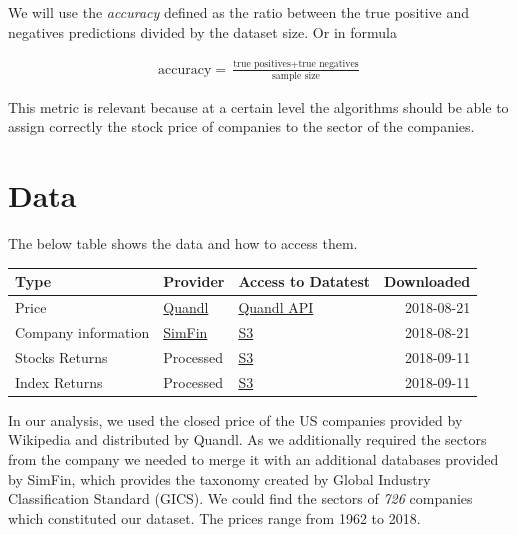\documentclass[a4paper,twoside]{article}
\begin{document}
We will use the \emph{accuracy} defined as the ratio between the true positive and
negatives predictions divided by the dataset size. Or in formula

\begin{align*}
  \textrm{accuracy} = \frac{\textrm{true positives} + \textrm{true negatives}}{\textrm{sample size}}
\end{align*}

This metric is relevant because at a certain level the algorithms should be
able to assign correctly the stock price of companies to the sector of the
companies.


\section{Data}
\label{sec:org7896a9a}

The below table shows the data and how to access them.

\begin{center}
\begin{tabular}{lllr}
Type & Provider & Access to Datatest & Downloaded\\
\hline
Price & \href{https://www.quandl.com/databases/WIKIP/documentation/about}{Quandl} & \href{https://www.quandl.com/databases/WIKIP}{Quandl API} & 2018-08-21\\
Company information & \href{https://simfin.com/data/find/}{SimFin} & \href{https://s3.us-east-2.amazonaws.com/udacity-capstone-data-davidpham87/data/company\_fundamentals.csv}{S3} & 2018-08-21\\
Stocks Returns & Processed & \href{https://s3.us-east-2.amazonaws.com/udacity-capstone-data-davidpham87/data/wiki\_indices\_returns.csv}{S3} & 2018-09-11\\
Index Returns & Processed & \href{https://s3.us-east-2.amazonaws.com/udacity-capstone-data-davidpham87/data/wiki\_stocks\_returns.csv}{S3} & 2018-09-11\\
\hline
\end{tabular}
\end{center}

In our analysis, we used the closed price of the US companies provided by
Wikipedia and distributed by Quandl. As we additionally required the sectors
from the company we needed to merge it with an additional databases provided by
SimFin, which provides the taxonomy created by Global Industry Classification
Standard (GICS). We could find the sectors of \emph{726}
companies which constituted our dataset. The prices range from 1962 to 2018.
\end{document}
